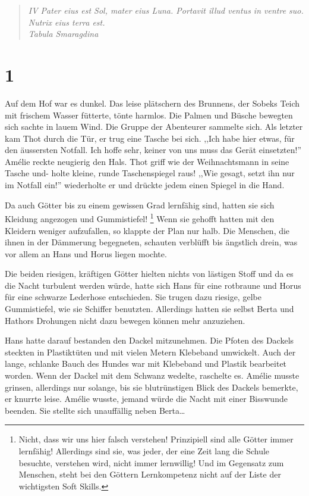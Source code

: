 \documentclass[11pt,titlepage,a5paper]{book}
\newcommand{\am}{Amélie }
\begin{document}
\begin{quotation}

\emph{IV Pater eius est Sol, mater eius Luna. Portavit illud ventus in ventre suo. Nutrix eius terra est. \\Tabula Smaragdina}

\end{quotation}



\section*{1}

Auf dem Hof war es dunkel. Das leise plätschern des Brunnens, der Sobeks Teich mit frischem Wasser fütterte, tönte harmlos. Die Palmen und Büsche bewegten sich sachte in lauem Wind. Die Gruppe der Abenteurer sammelte sich. Als letzter kam Thot durch die Tür, er trug eine Tasche bei sich. ,,Ich habe hier etwas, für den äussersten Notfall. Ich hoffe sehr, keiner von uns muss das Gerät einsetzten!'' Amélie reckte neugierig den Hals. Thot griff wie der Weihnachtsmann in seine Tasche und- holte kleine, runde Taschenspiegel raus! ,,Wie gesagt, setzt ihn nur im Notfall ein!'' wiederholte er und drückte jedem einen Spiegel in die Hand. 

Da auch Götter bis zu einem gewissen Grad lernfähig sind, hatten sie sich Kleidung angezogen und Gummistiefel! \footnote{Nicht, dass wir uns hier falsch verstehen! Prinzipiell sind alle Götter immer lernfähig! Allerdings sind sie, was jeder, der eine Zeit lang die Schule besuchte, verstehen wird, nicht immer lernwillig! Und im Gegensatz zum Menschen, steht bei den Göttern Lernkompetenz nicht auf der Liste der wichtigsten Soft Skills.} Wenn sie gehofft hatten mit den Kleidern weniger aufzufallen, so klappte der Plan nur halb. Die Menschen, die ihnen in der Dämmerung begegneten, schauten verblüfft bis ängstlich drein, was vor allem an Hans und Horus liegen mochte.

Die beiden riesigen, kräftigen Götter hielten nichts von lästigen Stoff und da es die Nacht turbulent werden würde, hatte sich Hans für eine rotbraune und Horus für eine schwarze Lederhose entschieden. Sie trugen dazu riesige, gelbe Gummistiefel, wie sie Schiffer benutzten. Allerdings hatten sie selbst Berta und Hathors Drohungen nicht dazu bewegen können mehr anzuziehen. 

Hans hatte darauf bestanden den Dackel mitzunehmen. Die Pfoten des Dackels steckten in Plastiktüten und mit vielen Metern Klebeband umwickelt. Auch der lange, schlanke Bauch des Hundes war mit Klebeband und Plastik bearbeitet worden. Wenn der Dackel mit dem Schwanz wedelte, raschelte es. \am musste grinsen, allerdings nur solange, bis sie blutrünstigen Blick des Dackels bemerkte, er knurrte leise. \am wusste, jemand würde die Nacht mit einer Bisswunde beenden. Sie stellte sich unauffällig neben Berta\dots
\end{document}
